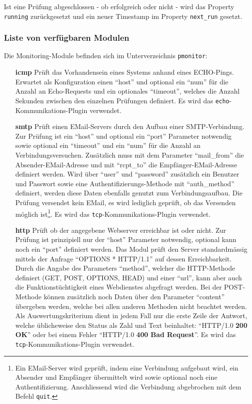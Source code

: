 Ist eine Pr\"ufung abgeschlossen - ob erfolgreich oder nicht - wird das Property \texttt{running} zur\"uckgesetzt und ein neuer Timestamp im Property \texttt{next\_run} gesetzt.

\subsubsection{Liste von verf\"ugbaren Modulen} \label{sec:praxis-basis-monitor-list}
Die Monitoring-Module befinden sich im Unterverzeichnis \texttt{pmonitor}:
\begin{itemize}
 \item[\textbf{icmp}] Pr\"uft das Vorhandensein eines Systems anhand eines ECHO-Pings. Erwartet als Konfiguration einen "`host"' und optional ein "`num"' f\"ur die Anzahl an Echo-Requests und ein optionales "`timeout"', welches die Anzahl Sekunden zwischen den einzelnen Pr\"ufungen definiert. Es wird das \texttt{echo}-Kommunikations-Plugin verwendet.

 \item[\textbf{smtp}] Pr\"uft einen EMail-Servers durch den Aufbau einer SMTP-Verbindung. Zur Pr\"ufung ist ein "`host"' und optional ein "`port"' Parameter notwendig sowie optional ein "`timeout"' und ein "`num"' f\"ur die Anzahl an Verbindungsversuchen. Zus\"atzlich muss mit dem Parameter "`mail\_from"' die Absender-EMail-Adresse und mit "`rcpt\_to"' die Empf\"anger-EMail-Adresse definiert werden. Wird \"uber "`user"' und "`password"' zus\"atzlich ein Benutzer und Passwort sowie eine Authentifizierungs-Methode mit "`auth\_method"' definiert, werden diese Daten ebenfalls genutzt zum Verbindungsaufbau. Die Pr\"ufung versendet kein EMail, es wird lediglich gepr\"uft, ob das Versenden m\"oglich ist\footnote{Ein EMail-Server wird gepr\"uft, indem eine Verbindung aufgebaut wird, ein Absender und Empf\"anger \"ubermittelt wird sowie optional noch eine Authentifizierung. Anschliessend wird die Verbindung abgebrochen mit dem Befehl \texttt{quit}.}. Es wird das \texttt{tcp}-Kommunikations-Plugin verwendet.

 \item[\textbf{http}] Pr\"uft ob der angegebene Webserver erreichbar ist oder nicht. Zur Pr\"ufung ist prinzipiell nur der "`host"' Parameter notwendig, optional kann noch ein "`port"' definiert werden. Das Modul pr\"uft den Server standardm\"assig mittels der Anfrage "`OPTIONS * HTTP/1.1"' auf dessen Erreichbarkeit. Durch die Angabe des Parameters "`method"', welcher die HTTP-Methode definiert (GET, POST, OPTIONS, HEAD) und einer "`url"', kann aber auch die Funktionst\"uchtigkeit eines Webdienstes abgefragt werden. Bei der POST-Methode k\"onnen zus\"atzlich noch Daten \"uber den Parameter "`content"' \"ubergeben werden, welche bei allen anderen Methoden nicht beachtet werden. Als Auswertungskriterium dient in jedem Fall nur die erste Zeile der Antwort, welche \"ublicheweise den Status als Zahl und Text beinhaltet: "`HTTP/1.0 \textbf{200 OK}"' oder bei einem Fehler "`HTTP/1.0 \textbf{400 Bad Request}"'.  Es wird das \texttt{tcp}-Kommunikations-Plugin verwendet.
\end{itemize}

